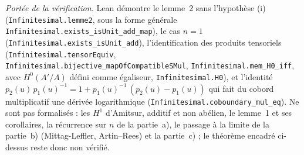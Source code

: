 \begingroup\raggedright
\noindent\emph{Portée de la vérification.} Lean démontre le lemme~2 sans l'hypothèse (i) (\texttt{Infinitesimal.\allowbreak{}lemme2}, sous la forme générale \texttt{Infinitesimal.\allowbreak{}exists\_isUnit\_add\_map}), le cas $n = 1$ (\texttt{Infinitesimal.\allowbreak{}exists\_isUnit\_add}), l'identification des produits tensoriels (\texttt{Infinitesimal.\allowbreak{}tensorEquiv}, \texttt{Infinitesimal.\allowbreak{}bijective\_mapOfCompatibleSMul}, \texttt{Infinitesimal.\allowbreak{}mem\_H0\_iff}, avec $H^0(A'/A)$ défini comme égaliseur, \texttt{Infinitesimal.\allowbreak{}H0}), et l'identité $p_2(u)\,p_1(u)^{-1} = 1 + p_1(u)^{-1}\,(p_2(u) - p_1(u))$ qui fait du cobord multiplicatif une dérivée logarithmique (\texttt{Infinitesimal.\allowbreak{}coboundary\_mul\_eq}). Ne sont pas formalisés : les $H^1$ d'Amitsur, additif et non abélien, le lemme~1 et ses corollaires, la récurrence sur $n$ de la partie~a), le passage à la limite de la partie~b) (Mittag-Leffler, Artin--Rees) et la partie~c) ; le théorème encadré ci-dessus reste donc non vérifié.\par\endgroup
